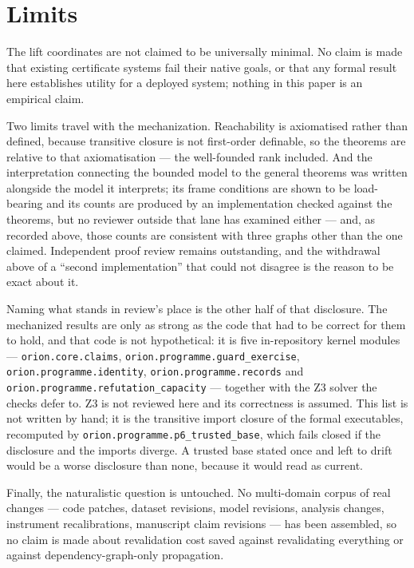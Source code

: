 \section{Limits}

The lift coordinates are not claimed to be universally minimal. No claim is made
that existing certificate systems fail their native goals, or that any formal
result here establishes utility for a deployed system; nothing in this paper is
an empirical claim.

Two limits travel with the mechanization. Reachability is axiomatised rather
than defined, because transitive closure is not first-order definable, so the
theorems are relative to that axiomatisation --- the well-founded rank included.
And the interpretation connecting the bounded model to the general theorems was
written alongside the model it interprets; its frame conditions are shown to be
load-bearing and its counts are produced by an implementation checked against
the theorems, but no reviewer outside that lane has examined either --- and, as
recorded above, those counts are consistent with three graphs other than the one
claimed. Independent
proof review remains outstanding, and the withdrawal above of a ``second
implementation'' that could not disagree is the reason to be exact about it.

Naming what stands in review's place is the other half of that disclosure. The
mechanized results are only as strong as the code that had to be correct for
them to hold, and that code is not hypothetical: it is five in-repository
kernel modules --- \texttt{orion.core.claims},
\texttt{orion.programme.guard\_exercise}, \texttt{orion.programme.identity},
\texttt{orion.programme.records} and
\texttt{orion.programme.refutation\_capacity} --- together with the Z3 solver
the checks defer to. Z3 is not reviewed here and its correctness is assumed.
This list is not written by hand; it is the transitive import closure of the
formal executables, recomputed by \texttt{orion.programme.p6\_trusted\_base},
which fails closed if the disclosure and the imports diverge. A trusted base
stated once and left to drift would be a worse disclosure than none, because it
would read as current.

Finally, the naturalistic question is untouched. No multi-domain corpus of real
changes --- code patches, dataset revisions, model revisions, analysis changes,
instrument recalibrations, manuscript claim revisions --- has been assembled, so
no claim is made about revalidation cost saved against revalidating everything
or against dependency-graph-only propagation.
